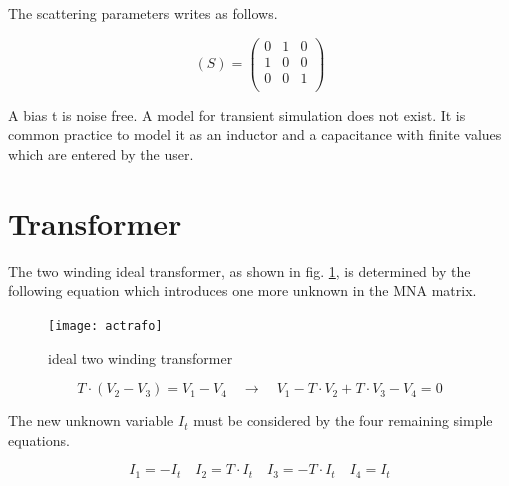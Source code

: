 The scattering parameters writes as follows.

\begin{equation}
(S) =
\begin{pmatrix}
0 & 1 & 0\\
1 & 0 & 0\\
0 & 0 & 1\\
\end{pmatrix}
\end{equation}

A bias t is noise free. A model for transient simulation does not
exist. It is common practice to model it as an inductor and a
capacitance with finite values which are entered by the user.


\section{Transformer}

The two winding ideal transformer, as shown in fig.
\ref{fig:trafo}, is determined by the following equation which
introduces one more unknown in the MNA matrix.

\begin{figure}[ht]
\begin{center}
\texttt{[image: actrafo]}
\end{center}
\caption{ideal two winding transformer}
\label{fig:trafo}
\end{figure}
\FloatBarrier

\begin{equation}
T\cdot\left(V_{2} - V_{3}\right) = V_{1} -V_{4}
\quad \rightarrow \quad
V_{1} - T\cdot V_{2} + T\cdot V_{3} - V_{4} = 0
\label{eq:trafo}
\end{equation}

The new unknown variable $I_{t}$ must be considered by the four
remaining simple equations.

\begin{equation}
I_{1} = -I_{t} \quad I_{2} = T\cdot I_{t} \quad I_{3} = -T\cdot I_{t} \quad I_{4} = I_{t}
\end{equation}

